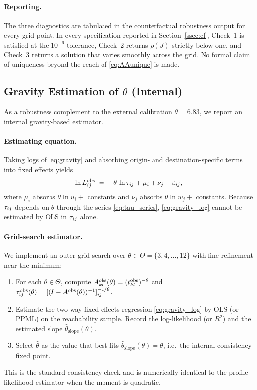 \paragraph{Reporting.}
The three diagnostics are tabulated in the counterfactual robustness
output for every grid point.  In every specification reported in
Section~\ref{ssec:cf}, Check~1 is satisfied at the $10^{-6}$
tolerance, Check~2 returns $\rho(J)$ strictly below one, and
Check~3 returns a solution that varies smoothly across the grid.
No formal claim of uniqueness beyond the reach of
\eqref{eq:AAunique} is made.

\subsection{Gravity Estimation of $\theta$ (Internal)}\label{app:theta}

As a robustness complement to the external calibration $\theta=6.83$,
we report an internal gravity-based estimator.

\paragraph{Estimating equation.}
Taking logs of \eqref{eq:gravity} and absorbing origin- and
destination-specific terms into fixed effects yields
\begin{equation}\label{eq:gravity_log}
  \ln L_{ij}^{\mathrm{obs}}
  \;=\;
  -\theta\,\ln\tau_{ij}
  +\mu_i+\nu_j+\varepsilon_{ij},
\end{equation}
where $\mu_i$ absorbs $\theta\ln u_i+$ constants and $\nu_j$
absorbs $\theta\ln w_j+$ constants.  Because $\tau_{ij}$ depends on
$\theta$ through the series \eqref{eq:tau_series}, \eqref{eq:gravity_log}
cannot be estimated by OLS in $\tau_{ij}$ alone.

\paragraph{Grid-search estimator.}
We implement an outer grid search over
$\theta\in\Theta=\{3,4,\ldots,12\}$ with fine refinement near
the minimum:
\begin{enumerate}[leftmargin=2em,itemsep=0.15em]
  \item For each $\theta\in\Theta$, compute
        $A^{\mathrm{obs}}_{kl}(\theta)=(t_{kl}^{\mathrm{obs}})^{-\theta}$ and
        $\tau_{ij}^{\mathrm{obs}}(\theta)=[(I-A^{\mathrm{obs}}(\theta))^{-1}]_{ij}^{-1/\theta}$.
  \item Estimate the two-way fixed-effects regression
        \eqref{eq:gravity_log} by OLS (or PPML) on the reachability
        sample.  Record the log-likelihood (or $R^2$) and the
        estimated slope $\hat\theta_{\mathrm{slope}}(\theta)$.
  \item Select $\hat\theta$ as the value that best fits
        $\hat\theta_{\mathrm{slope}}(\theta)=\theta$, i.e.\ the
        internal-consistency fixed point.
\end{enumerate}
This is the standard consistency check and is numerically identical
to the profile-likelihood estimator when the moment is quadratic.

